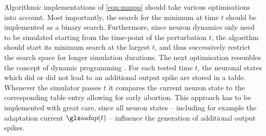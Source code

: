 Algorithmic implementations of \cref{eqn:mmpp} should take various optimisations into account. Most importantly, the search for the minimum \pum at time $t$ should be implemented as a binary search. Furthermore, since neuron dynamics only need to be simulated starting from the time-point of the perturbation $t$, the algorithm should start its minimum search at the largest $t$, and thus successively restrict the search space for longer simulation durations. The next optimisation resembles the concept of dynamic programming \cite{bellman1957dynamic}. For each tested time $t$, the neuronal states \nState which did or did not lead to an additional output spike are stored in a table. Whenever the simulator passes $t$ it compares the current neuron state to the corresponding table entry allowing for early abortion. This approach has to be implemented with great care, since all neuron states -- including for example the adaptation current $\iadap(t)$ -- influence the generation of additional output spikes.


